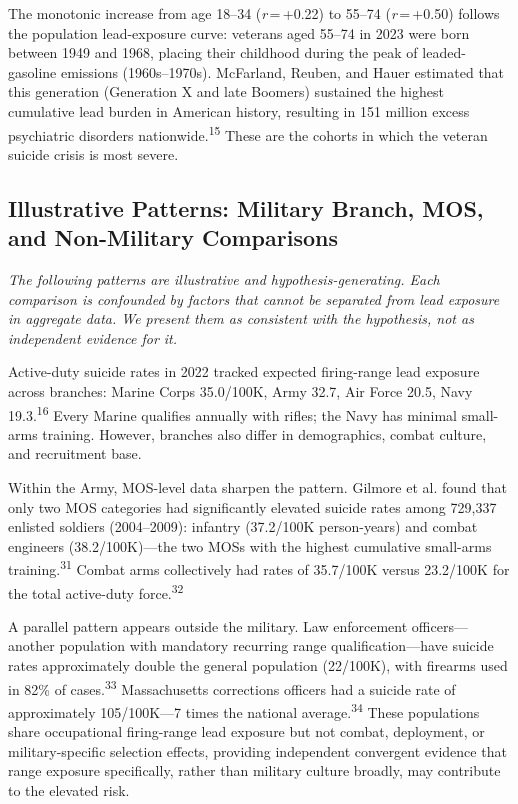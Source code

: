 \documentclass[11pt,twocolumn]{article}
\begin{document}
The monotonic increase from age 18--34 (\textit{r}\,=\,+0.22) to 55--74 (\textit{r}\,=\,+0.50) follows the population lead-exposure curve: veterans aged 55--74 in 2023 were born between 1949 and 1968, placing their childhood during the peak of leaded-gasoline emissions (1960s--1970s). McFarland, Reuben, and Hauer estimated that this generation (Generation X and late Boomers) sustained the highest cumulative lead burden in American history, resulting in 151 million excess psychiatric disorders nationwide.\textsuperscript{15} These are the cohorts in which the veteran suicide crisis is most severe.


\subsection{Illustrative Patterns: Military Branch, MOS, and Non-Military Comparisons}

\textit{The following patterns are illustrative and hypothesis-generating. Each comparison is confounded by factors that cannot be separated from lead exposure in aggregate data. We present them as consistent with the hypothesis, not as independent evidence for it.}

Active-duty suicide rates in 2022 tracked expected firing-range lead exposure across branches: Marine Corps 35.0/100K, Army 32.7, Air Force 20.5, Navy 19.3.\textsuperscript{16} Every Marine qualifies annually with rifles; the Navy has minimal small-arms training. However, branches also differ in demographics, combat culture, and recruitment base.

Within the Army, MOS-level data sharpen the pattern. Gilmore et al. found that only two MOS categories had significantly elevated suicide rates among 729,337 enlisted soldiers (2004--2009): infantry (37.2/100K person-years) and combat engineers (38.2/100K)---the two MOSs with the highest cumulative small-arms training.\textsuperscript{31} Combat arms collectively had rates of 35.7/100K versus 23.2/100K for the total active-duty force.\textsuperscript{32}

A parallel pattern appears outside the military. Law enforcement officers---another population with mandatory recurring range qualification---have suicide rates approximately double the general population (22/100K), with firearms used in 82\% of cases.\textsuperscript{33} Massachusetts corrections officers had a suicide rate of approximately 105/100K---7 times the national average.\textsuperscript{34} These populations share occupational firing-range lead exposure but not combat, deployment, or military-specific selection effects, providing independent convergent evidence that range exposure specifically, rather than military culture broadly, may contribute to the elevated risk.
\end{document}
